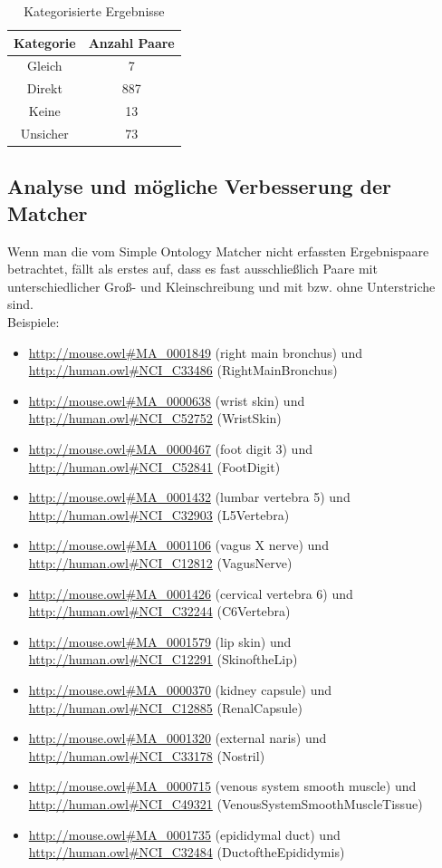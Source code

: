 		\begin{table}[h!]
		\centering
		\caption{Kategorisierte Ergebnisse}
		\begin{tabular}{|c|c|}\hline
		Kategorie & Anzahl Paare\\ \hline
		Gleich & 7\\ \hline
		Direkt & 887\\ \hline
		Keine & 13\\ \hline
		Unsicher & 73\\ \hline
		\end{tabular}
		\end{table}
		
		\subsection{Analyse und mögliche Verbesserung der Matcher}
		Wenn man die vom Simple Ontology Matcher nicht erfassten Ergebnispaare
		betrachtet, fällt als erstes auf, dass es fast ausschließlich Paare mit
		unterschiedlicher Groß- und Kleinschreibung und mit bzw. ohne Unterstriche
		sind.\\
		Beispiele:
		\begin{itemize}
		\item \url{http://mouse.owl#MA_0001849} (right main bronchus) und \url{http://human.owl#NCI_C33486} (Right\textunderscore Main\textunderscore Bronchus)
		\item \url{http://mouse.owl#MA_0000638} (wrist skin) und \url{http://human.owl#NCI_C52752} (Wrist\textunderscore Skin)
		\item \url{http://mouse.owl#MA_0000467} (foot digit 3) und \url{http://human.owl#NCI_C52841} (Foot\textunderscore Digit)
		\item \url{http://mouse.owl#MA_0001432} (lumbar vertebra 5) und \url{http://human.owl#NCI_C32903} (L5\textunderscore Vertebra)
		\item \url{http://mouse.owl#MA_0001106} (vagus X nerve) und \url{http://human.owl#NCI_C12812} (Vagus\textunderscore Nerve)
		\item \url{http://mouse.owl#MA_0001426} (cervical vertebra 6) und \url{http://human.owl#NCI_C32244} (C6\textunderscore Vertebra)
		\item \url{http://mouse.owl#MA_0001579} (lip skin) und \url{http://human.owl#NCI_C12291} (Skin\textunderscore of\textunderscore the\textunderscore Lip)
		\item \url{http://mouse.owl#MA_0000370} (kidney capsule) und \url{http://human.owl#NCI_C12885} (Renal\textunderscore Capsule)
		\item \url{http://mouse.owl#MA_0001320} (external naris) und \url{http://human.owl#NCI_C33178} (Nostril)
		\item \url{http://mouse.owl#MA_0000715} (venous system smooth muscle) und \url{http://human.owl#NCI_C49321} (Venous\textunderscore System\textunderscore Smooth\textunderscore Muscle\textunderscore Tissue)
		\item \url{http://mouse.owl#MA_0001735} (epididymal duct) und \url{http://human.owl#NCI_C32484} (Duct\textunderscore of\textunderscore the\textunderscore Epididymis)
		\end{itemize}